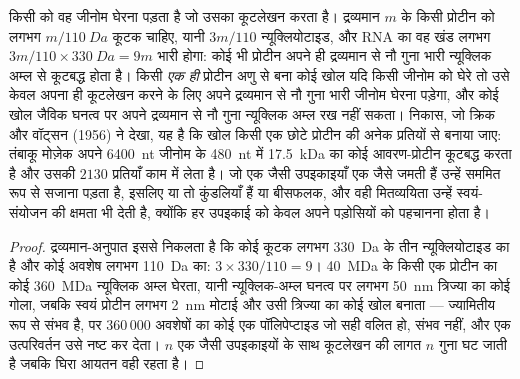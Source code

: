 \begin{proposition}[आनुवंशिक मितव्ययिता: कैप्सिड सममित क्यों होते हैं]\label{prop:b3:virology:economy}
किसी  को वह जीनोम घेरना पड़ता है जो उसका कूटलेखन करता है। द्रव्यमान
$m$ के किसी प्रोटीन को लगभग $m/\qty{110}{Da}$ कूटक चाहिए, यानी
$3m/110$ न्यूक्लियोटाइड, और RNA का वह खंड लगभग
$3m/110\times\qty{330}{Da} = 9m$ भारी होगा: कोई भी प्रोटीन अपने ही
द्रव्यमान से नौ गुना भारी न्यूक्लिक अम्ल से कूटबद्ध होता है। किसी
\emph{एक ही} प्रोटीन अणु से बना कोई खोल यदि किसी जीनोम को घेरे तो उसे
केवल अपना ही कूटलेखन करने के लिए अपने द्रव्यमान से नौ गुना भारी जीनोम
घेरना पड़ेगा, और कोई खोल जैविक घनत्व पर अपने द्रव्यमान से नौ गुना
न्यूक्लिक अम्ल रख नहीं सकता। निकास, जो क्रिक और वॉट्सन (1956) ने देखा,
यह है कि खोल किसी एक छोटे प्रोटीन की अनेक प्रतियों से बनाया जाए: तंबाकू
मोज़ेक  अपने \qty{6400}{nt} जीनोम के \qty{480}{nt} में
\qty{17.5}{kDa} का कोई आवरण-प्रोटीन कूटबद्ध करता है और उसकी $2130$
प्रतियाँ काम में लेता है। जो एक जैसी उपइकाइयाँ एक जैसे जमती हैं उन्हें
सममित रूप से सजाना पड़ता है, इसलिए   या तो कुंडलियाँ हैं या
बीसफलक, और वही मितव्ययिता उन्हें स्वयं-संयोजन की क्षमता भी देती है,
क्योंकि हर उपइकाई को केवल अपने पड़ोसियों को पहचानना होता है।
\end{proposition}
\begin{proof}
द्रव्यमान-अनुपात इससे निकलता है कि कोई कूटक लगभग \qty{330}{Da} के तीन
न्यूक्लियोटाइड का है और कोई अवशेष लगभग \qty{110}{Da} का: $3\times 330/110 =
9$। \qty{40}{MDa} के किसी एक प्रोटीन का कोई  \qty{360}{MDa}
न्यूक्लिक अम्ल घेरता, यानी न्यूक्लिक-अम्ल घनत्व पर लगभग \qty{50}{nm}
त्रिज्या का कोई गोला, जबकि स्वयं प्रोटीन लगभग \qty{2}{nm} मोटाई और उसी
त्रिज्या का कोई खोल बनाता --- ज्यामितीय रूप से संभव है, पर
$360\,000$ अवशेषों का कोई एक पॉलिपेप्टाइड जो सही वलित हो, संभव नहीं, और
एक उत्परिवर्तन उसे नष्ट कर देता। $n$ एक जैसी उपइकाइयों के साथ
कूटलेखन की लागत $n$ गुना घट जाती है जबकि घिरा आयतन वही रहता है।
\end{proof}

